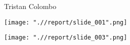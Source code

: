 \documentclass{df-report}
\begin{document}
{}{Tristan Colombo}{} 

\tableofcontents

\newpage
\begin{center}
  \texttt{[image: ".//report/slide\_001".png]}
\end{center}
\vspace{2cm}
\begin{center}
  \texttt{[image: ".//report/slide\_003".png]}
\end{center}
\newpage


\displayIndex{}
\end{document}
